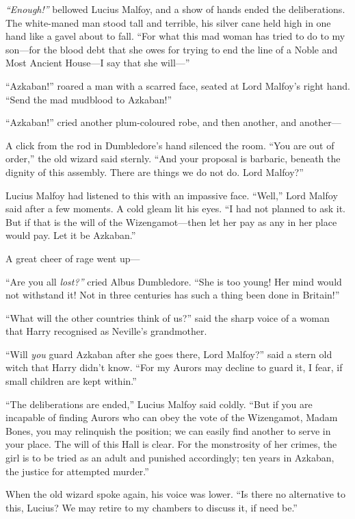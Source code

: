 \emph{``Enough!''} bellowed Lucius Malfoy, and a show of hands ended the
deliberations. The white-maned man stood tall and terrible, his silver
cane held high in one hand like a gavel about to fall. ``For what this
mad woman has tried to do to my son---for the blood debt that she owes
for trying to end the line of a Noble and Most Ancient House---I say
that she will---''

``Azkaban!'' roared a man with a scarred face, seated at Lord Malfoy's
right hand. ``Send the mad mudblood to Azkaban!''

``Azkaban!'' cried another plum-coloured robe, and then another, and
another---

A click from the rod in Dumbledore's hand silenced the room. ``You are
out of order,'' the old wizard said sternly. ``And your proposal is
barbaric, beneath the dignity of this assembly. There are things we do
not do. Lord Malfoy?''

Lucius Malfoy had listened to this with an impassive face. ``Well,''
Lord Malfoy said after a few moments. A cold gleam lit his eyes. ``I had
not planned to ask it. But if that is the will of the Wizengamot---then
let her pay as any in her place would pay. Let it be Azkaban.''

A great cheer of rage went up---

``Are you all \emph{lost?''} cried Albus Dumbledore. ``She is too young!
Her mind would not withstand it! Not in three centuries has such a thing
been done in Britain!''

``What will the other countries think of us?'' said the sharp voice of a
woman that Harry recognised as Neville's grandmother.

``Will \emph{you} guard Azkaban after she goes there, Lord Malfoy?''
said a stern old witch that Harry didn't know. ``For my Aurors may
decline to guard it, I fear, if small children are kept within.''

``The deliberations are ended,'' Lucius Malfoy said coldly. ``But if you
are incapable of finding Aurors who can obey the vote of the Wizengamot,
Madam Bones, you may relinquish the position; we can easily find another
to serve in your place. The will of this Hall is clear. For the
monstrosity of her crimes, the girl is to be tried as an adult and
punished accordingly; ten years in Azkaban, the justice for attempted
murder.''

When the old wizard spoke again, his voice was lower. ``Is there no
alternative to this, Lucius? We may retire to my chambers to discuss it,
if need be.''

